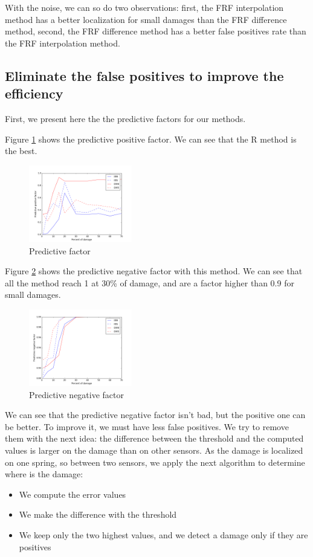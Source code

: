 \documentclass[journal]{IEEEtran}
\begin{document}
With the noise, we can so do two observations: first, the FRF interpolation method has a better localization for small damages than the FRF difference method, second,  the FRF difference method has a better false positives rate than the FRF interpolation method.


\subsection{Eliminate the false positives to improve the efficiency}

First, we present here the the predictive factors for our methods.

Figure \ref{pred} shows the predictive positive factor. We can see that the R method is the best.

\begin{figure}[h!]
  \centering
  \includegraphics[width=0.4\textwidth]{images/pred.png}
  \caption{Predictive factor}
  \label{pred}
\end{figure}

Figure \ref{pred_neg} shows the predictive negative factor with this method. We can see that all the method reach 1 at 30\% of damage, and are a factor higher than 0.9 for small damages.
\begin{figure}[h!]
  \centering
  \includegraphics[width=0.4\textwidth]{images/pred_neg.png}
  \caption{Predictive negative factor}
  \label{pred_neg}
\end{figure}

We can see that the predictive negative factor isn't bad, but the positive one can be better. To improve it, we must have less false positives. We try to remove them with the next idea: the difference between the threshold and the computed values is larger on the damage than on other sensors. As the damage is localized on one spring, so between two sensors, we apply the next algorithm to determine where is the damage:
\begin{itemize}
\item We compute the error values
\item We make the difference with the threshold
\item We keep only the two highest values, and we detect a damage only if they are positives
\end{itemize}
\end{document}
